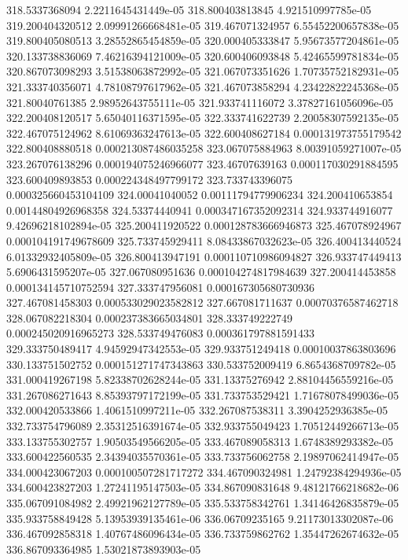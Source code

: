 {318.5337368094 2.2211645431449e-05
318.800403813845 4.921510997785e-05
319.200404320512 2.09991266668481e-05
319.467071324957 6.55452200657838e-05
319.800405080513 3.28552865454859e-05
320.000405333847 5.95673577204861e-05
320.133738836069 7.46216394121009e-05
320.600406093848 5.42465599781834e-05
320.867073098293 3.51538063872992e-05
321.067073351626 1.70735752182931e-05
321.333740356071 4.78108797617962e-05
321.467073858294 4.23422822245368e-05
321.80040761385 2.98952643755111e-05
321.933741116072 3.37827161056096e-05
322.200408120517 5.65040116371595e-05
322.333741622739 2.20058307592135e-05
322.467075124962 8.61069363247613e-05
322.600408627184 0.000131973755179542
322.800408880518 0.000213087486035258
323.067075884963 8.00391059271007e-05
323.267076138296 0.000194075246966077
323.46707639163 0.000117030291884595
323.600409893853 0.000224348497799172
323.733743396075 0.000325660453104109
324.00041040052 0.00111794779906234
324.200410653854 0.00144804926968358
324.53374440941 0.000347167352092314
324.933744916077 9.42696218102894e-05
325.200411920522 0.000128783666946873
325.467078924967 0.000104191749678609
325.733745929411 8.08433867032623e-05
326.400413440524 6.01332932405809e-05
326.800413947191 0.000110710986094827
326.933747449413 5.6906431595207e-05
327.067080951636 0.000104274817984639
327.200414453858 0.000134145710752594
327.333747956081 0.000167305680730936
327.467081458303 0.000533029023582812
327.667081711637 0.00070376587462718
328.067082218304 0.000237383665034801
328.333749222749 0.000245020916965273
328.533749476083 0.000361797881591433
329.333750489417 4.94592947342553e-05
329.933751249418 0.00010037863803696
330.133751502752 0.000151271747343863
330.533752009419 6.8654368709782e-05
331.000419267198 5.82338702628244e-05
331.13375276942 2.88104456559216e-05
331.267086271643 8.85393797172199e-05
331.733753529421 1.71678078499036e-05
332.000420533866 1.4061510997211e-05
332.267087538311 3.3904252936385e-05
332.733754796089 2.35312516391674e-05
332.933755049423 1.70512449266713e-05
333.133755302757 1.90503549566205e-05
333.467089058313 1.6748389293382e-05
333.600422560535 2.34394035570361e-05
333.733756062758 2.19897062414947e-05
334.000423067203 0.000100507281717272
334.467090324981 1.24792384294936e-05
334.600423827203 1.27241195147503e-05
334.867090831648 9.48121766218682e-06
335.067091084982 2.49921962127789e-05
335.533758342761 1.34146426835879e-05
335.933758849428 5.13953939135461e-06
336.06709235165 9.21173013302087e-06
336.467092858318 1.40767486096434e-05
336.733759862762 1.35447262674632e-05
336.867093364985 1.53021873893903e-05
}
